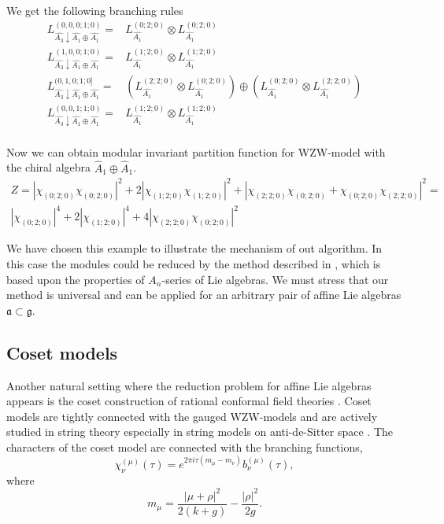 \documentclass[a4paper,12pt]{article}
\theoremstyle{definition} \newtheorem{Def}{Definition}
\begin{document}
 We get the following branching rules
 \begin{equation}
   \label{eq:39}
   \begin{array}{ll}
     L^{(0,0,0;1;0)}_{\hat{A_3}\downarrow \hat{A_1}\oplus \hat{A_1}}= & L_{\hat{A_1}}^{(0;2;0)}\otimes L_{\hat{A_1}}^{(0;2;0)} \\
     L^{(1,0,0;1;0)}_{\hat{A_3}\downarrow \hat{A_1}\oplus \hat{A_1}}= & L_{\hat{A_1}}^{(1;2;0)}\otimes L_{\hat{A_1}}^{(1;2;0)} \\
     L^{(0,1,0;1;0]}_{\hat{A_3}\downarrow \hat{A_1}\oplus \hat{A_1}}= & \left( L_{\hat{A_1}}^{(2;2;0)}\otimes L_{\hat{A_1}}^{(0;2;0)}\right) \oplus \left( L_{\hat{A_1}}^{(0;2;0)}\otimes L_{\hat{A_1}}^{(2;2;0)}\right) \\
     L^{(0,0,1;1;0)}_{\hat{A_3}\downarrow \hat{A_1}\oplus \hat{A_1}}= & L_{\hat{A_1}}^{(1;2;0)}\otimes L_{\hat{A_1}}^{(1;2;0)} \\     
   \end{array}
 \end{equation}

Now we can obtain modular invariant partition function for WZW-model with the chiral algebra $\hat{A}_1\oplus \hat{A}_1$.
\begin{multline}
  \label{eq:40}
  Z=\left|\chi_{(0;2;0)}\chi_{(0;2;0)}\right|^2+2\left|\chi_{(1;2;0)}\chi_{(1;2;0)}\right|^2+ \left|\chi_{(2;2;0)}\chi_{(0;2;0)}+\chi_{(0;2;0)}\chi_{(2;2;0)}\right|^2=\\
  \left|\chi_{(0;2;0)}\right|^4+2\left|\chi_{(1;2;0)}\right|^4+ 4\left|\chi_{(2;2;0)}\chi_{(0;2;0)}\right|^2
\end{multline}

We have chosen this example to illustrate the mechanism of out algorithm. 
In this case the modules could be reduced by the method described in \cite{walton1989conformal}, which is based upon the properties of $A_n$-series of Lie algebras. We must stress that our method is universal and can be applied for an arbitrary pair of affine Lie algebras $\mathfrak{a}\subset\mathfrak{g}$.

\subsection{Coset models}
\label{sec:coset-models}

Another natural setting where the reduction problem for affine Lie algebras appears is the coset construction of rational conformal field theories \cite{Goddard198588}. Coset models are tightly connected with the gauged WZW-models and are actively studied in string theory especially in string models on anti-de-Sitter space \cite{Maldacena:2000hw,Maldacena:2000kv,Maldacena:2001km,Maldacena:2001ky,Aharony:1999ti}. The characters of the coset model are connected with the branching functions,
\begin{equation}
  \label{eq:31}
  \chi^{(\mu)}_{\nu}(\tau)=e^{2\pi i \tau (m_{\mu}-m_{\nu})} b^{(\mu)}_{\nu}(\tau),
\end{equation}
where
\begin{equation}
  \label{eq:46}
  m_{\mu}=\frac{\left|\mu+\rho\right|^2}{2(k+g)}-\frac{\left|\rho\right|^2}{2g}.
\end{equation}
\end{document}
